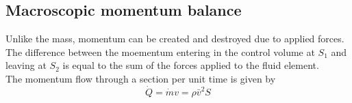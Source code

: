 	\subsection{Macroscopic momentum balance}
		Unlike the mass, momentum can be created and destroyed due to applied forces. The difference between the moementum entering in the control volume at $S_1$ and leaving at $S_2$ is equal to the sum of the forces applied to the fluid element. \\
		The momentum flow through a section per unit time is given by 
		\begin{equation}
			\dot{Q} = \dot{m}v = \rho \bar{v}^2 S
		\end{equation}
			
			
